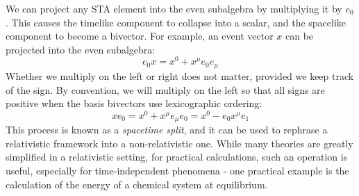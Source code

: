 We can project any STA element into the even subalgebra by multiplying it by $e_0$. This causes the
timelike component to collapse into a scalar, and the spacelike component to become a bivector. For
example, an event vector $x$ can be projected into the even subalgebra:
$$
e_0 x = x^0 + x^\mu e_0 e_\mu
$$
Whether we multiply on the left or right does not matter, provided we keep track of the sign. By
convention, we will multiply on the left so that all signs are positive when the basis bivectors use
lexicographic ordering:
$$
x e_0 = x^0 + x^\mu e_\mu e_0 =  x^0 - e_0 x^\mu e_1
$$
This process is known as a \textit{spacetime split}, and it can be used to rephrase a relativistic
framework into a non-relativistic one. While many theories are greatly simplified in a relativistic
setting, for practical calculations, such an operation is useful, especially for time-independent
phenomena - one practical example is the calculation of the energy of a chemical system at
equilibrium.

